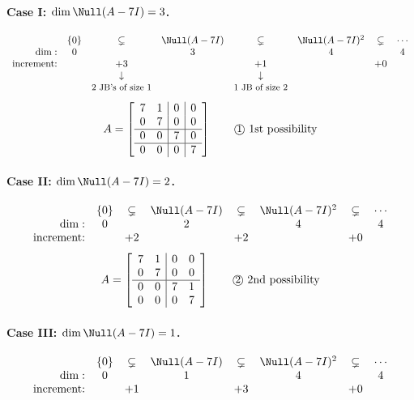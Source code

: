 
\paragraph{Case I: $\dim\Null(A-7I)=3$.}
\[
\begin{array}{r@{\quad}ccccccc}
 & \{0\} & \subsetneq & \Null(A-7I) & \subsetneq & \Null(A-7I)^2 & \subsetneq & \cdots\\
\dim: & 0 & & 3 & & 4 & & 4\\
\text{increment:} & & +3 & & +1 & & +0 &\\
 & & \downarrow & & \downarrow & & &\\
 & & \text{\small 2 JB's of size 1} & & \text{\small 1 JB of size 2} & & &
\end{array}
\]
\[
A=\left[\begin{array}{cc|c|c}
7 & 1 & 0 & 0\\
0 & 7 & 0 & 0\\ \hline
0 & 0 & 7 & 0\\ \hline
0 & 0 & 0 & 7
\end{array}\right]
\qquad \text{\textcircled{\small 1} 1st possibility}
\]

\paragraph{Case II: $\dim\Null(A-7I)=2$.}
\[
\begin{array}{r@{\quad}ccccccc}
 & \{0\} & \subsetneq & \Null(A-7I) & \subsetneq & \Null(A-7I)^2 & \subsetneq & \cdots\\
\dim: & 0 & & 2 & & 4 & & 4\\
\text{increment:} & & +2 & & +2 & & +0 &
\end{array}
\]
\[
A=\left[\begin{array}{cc|cc}
7 & 1 & 0 & 0\\
0 & 7 & 0 & 0\\ \hline
0 & 0 & 7 & 1\\
0 & 0 & 0 & 7
\end{array}\right]
\qquad \text{\textcircled{\small 2} 2nd possibility}
\]

\paragraph{Case III: $\dim\Null(A-7I)=1$.}
\[
\begin{array}{r@{\quad}ccccccc}
 & \{0\} & \subsetneq & \Null(A-7I) & \subsetneq & \Null(A-7I)^2 & \subsetneq & \cdots\\
\dim: & 0 & & 1 & & 4 & & 4\\
\text{increment:} & & +1 & & +3 & & +0 &
\end{array}
\]


